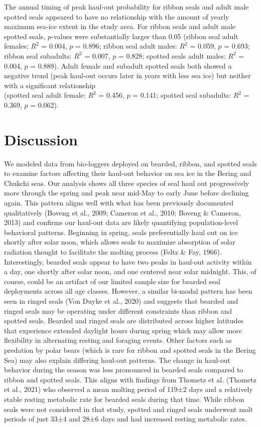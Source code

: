 \documentclass[fleqn,10pt,lineno]{wlpeerj} %
\begin{document}
The annual timing of peak haul-out probability for ribbon seals and adult
male spotted seals appeared to have
no relationship with the amount of yearly maximum sea-ice extent in the
study area. For ribbon seals and adult male spotted seals,
\(p\)-values were substantially larger than 0.05 (ribbon seal adult
females; \(R^{2}\) = 0.004, \(p\) = 0.896;
ribbon seal adult males: \(R^{2}\) = 0.059, \(p\) =
0.693; ribbon seal subadults: \(R^{2}\) =
0.007, \(p\) = 0.828; spotted seals
adult males: \(R^{2}\) = 0.004, \(p\) =
0.889). Adult female and subadult spotted seals both
showed a negative trend (peak haul-out occurs later in years with less
sea ice) but neither with a significant relationship\\
(spotted seal adult female: \(R^{2}\) =
0.456, \(p\) = 0.141; spotted seal
subadults: \(R^{2}\) = 0.369, \(p\) =
0.062).

\section*{Discussion}\label{discussion}

We modeled data from bio-loggers deployed on bearded, ribbon, and spotted seals
to examine factors affecting their haul-out behavior on sea ice in the Bering
and Chukchi seas. Our analysis shows all three species of seal haul out
progressively more through the spring and peak near mid-May to early June before
declining again. This pattern aligns well with what has been previously
documented qualitatively (Boveng et al., 2009; Cameron et al., 2010; Boveng \& Cameron, 2013) and confirms
our haul-out data are likely quantifying population-level behavioral patterns.
Beginning in spring, seals preferentially haul out on ice shortly after solar
noon, which allows seals to maximize absorption of solar radiation thought to
facilitate the molting process (Feltz \& Fay, 1966). Interestingly, bearded seals appear
to have two peaks in haul-out activity within a day, one shortly after solar
noon, and one centered near solar midnight. This, of course, could be an
artifact of our limited sample size for bearded seal deployments across all age
classes. However, a similar bi-modal pattern has been seen in ringed seals
(Von Duyke et al., 2020) and suggests that bearded and ringed seals may be operating
under different constraints than ribbon and spotted seals. Bearded and ringed
seals are distributed across higher latitudes that experience
extended daylight hours during spring which may allow more flexibility in
alternating resting and foraging events. Other factors such as predation by
polar bears (which is rare for ribbon and spotted seals in the Bering Sea) may
also explain differing haul-out patterns. The change in haul-out behavior during
the season was less pronounced in bearded seals compared to ribbon and spotted
seals. This aligns with findings from Thometz et al. (Thometz et al., 2021) who observed
a mean molting period of 119±2 days and a relatively stable resting metabolic
rate for bearded seals during that time. While ribbon seals were not considered
in that study, spotted and ringed seals underwent molt periods of just 33±4
and 28±6 days and had increased resting metabolic rates.
\end{document}
